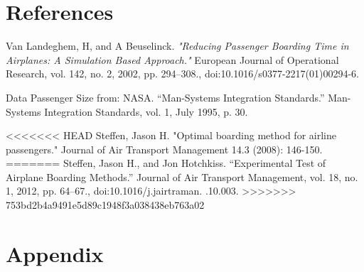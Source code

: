\documentclass[11pt]{article}
\begin{document}
\section{References}
\begin{thebibliography}{9}
	Van Landeghem, H, and A Beuselinck. 
	\textit{"Reducing Passenger Boarding Time in Airplanes: A Simulation Based Approach."} 
	European Journal of Operational Research, vol. 142, no. 2, 2002, pp. 294–308.,
	doi:10.1016/s0377-2217(01)00294-6.
	
	Data Passenger Size from:  NASA. “Man-Systems Integration Standards.” Man-Systems Integration Standards, vol. 1, July 1995, p. 30.
	
<<<<<<< HEAD
	Steffen, Jason H. "Optimal boarding method for airline passengers." Journal of Air Transport Management 14.3 (2008): 146-150.
=======
	Steffen, Jason H., and Jon Hotchkiss. “Experimental Test of Airplane Boarding Methods.” Journal of Air Transport Management, vol. 18, no. 1, 2012, pp. 64–67., doi:10.1016/j.jairtraman. .10.003.
>>>>>>> 753bd2b4a9491e5d89c1948f3a038438eb763a02
\end{thebibliography}




\section{Appendix}
\end{document}
